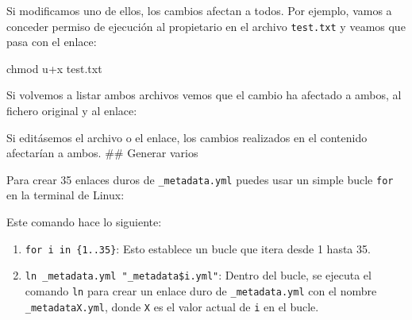 \documentclass[
  jou,
  floatsintext,
  longtable,
  a4paper,
  nolmodern,
  notxfonts,
  notimes,
  12pt,
  colorlinks=true,linkcolor=blue,citecolor=blue,urlcolor=blue]{apa7}
\newenvironment{Shaded}{\begin{snugshade}}{\end{snugshade}}
\newcommand{\AttributeTok}[1]{\textcolor[rgb]{0.40,0.45,0.13}{#1}}
\newcommand{\ControlFlowTok}[1]{\textcolor[rgb]{0.00,0.23,0.31}{\textbf{#1}}}
\newcommand{\DataTypeTok}[1]{\textcolor[rgb]{0.68,0.00,0.00}{#1}}
\newcommand{\DecValTok}[1]{\textcolor[rgb]{0.68,0.00,0.00}{#1}}
\newcommand{\ExtensionTok}[1]{\textcolor[rgb]{0.00,0.23,0.31}{#1}}
\newcommand{\FunctionTok}[1]{\textcolor[rgb]{0.28,0.35,0.67}{#1}}
\newcommand{\KeywordTok}[1]{\textcolor[rgb]{0.00,0.23,0.31}{\textbf{#1}}}
\newcommand{\NormalTok}[1]{\textcolor[rgb]{0.00,0.23,0.31}{#1}}
\newcommand{\StringTok}[1]{\textcolor[rgb]{0.13,0.47,0.30}{#1}}
\newcommand{\VariableTok}[1]{\textcolor[rgb]{0.07,0.07,0.07}{#1}}
\providecommand{\tightlist}{%
  \setlength{\itemsep}{0pt}\setlength{\parskip}{0pt}}
\begin{document}
Si modificamos uno de ellos, los cambios afectan a todos. Por ejemplo,
vamos a conceder permiso de ejecución al propietario en el archivo
\texttt{test.txt} y veamos que pasa con el enlace:

\begin{Shaded}
\begin{Highlighting}[]
\FunctionTok{chmod}\NormalTok{ u+x test.txt}
\end{Highlighting}
\end{Shaded}

Si volvemos a listar ambos archivos vemos que el cambio ha afectado a
ambos, al fichero original y al enlace:

\begin{Shaded}
\end{Shaded}

Si editásemos el archivo o el enlace, los cambios realizados en el
contenido afectarían a ambos. \#\# Generar varios

Para crear 35 enlaces duros de \texttt{\_metadata.yml} puedes usar un
simple bucle \texttt{for} en la terminal de Linux:

\begin{Shaded}
\end{Shaded}

Este comando hace lo siguiente:

\begin{enumerate}
\def\labelenumi{\arabic{enumi}.}
\tightlist
\item
  \texttt{for\ i\ in\ \{1..35\}}: Esto establece un bucle que itera
  desde 1 hasta 35.
\item
  \texttt{ln\ \_metadata.yml\ "\_metadata\$i.yml"}: Dentro del bucle, se
  ejecuta el comando \texttt{ln} para crear un enlace duro de
  \texttt{\_metadata.yml} con el nombre \texttt{\_metadataX.yml}, donde
  \texttt{X} es el valor actual de \texttt{i} en el bucle.
\end{enumerate}
\end{document}
